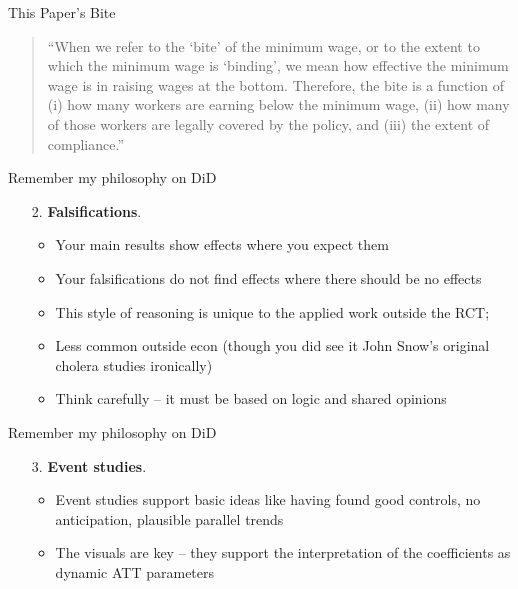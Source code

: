 \documentclass{beamer}
\begin{document}
\begin{frame}{This Paper's Bite}

\begin{quote}
``When we refer to the `bite' of the minimum wage, or to the extent to which the minimum wage is `binding', we mean how effective the minimum wage is in raising wages at the bottom.  Therefore, the bite is a function of (i) how many workers are earning below the minimum wage, (ii) how many of those workers are legally covered by the policy, and (iii) the extent of compliance.''
\end{quote}

\end{frame}



\begin{frame}{Remember my philosophy on DiD}

\begin{enumerate}
\item[2. ] \textbf{Falsifications}. 
	\begin{itemize}
	\item Your main results show effects where you expect them
	\item Your falsifications do not find effects where there should be no effects
	\item This style of reasoning is unique to the applied work outside the RCT;
	\item Less common outside econ (though you did see it John Snow's original cholera studies ironically)
	\item Think carefully -- it must be based on logic and shared opinions
	\end{itemize}
\end{enumerate}

\end{frame}


\begin{frame}{Remember my philosophy on DiD}

\begin{enumerate}
\item[3. ] \textbf{Event studies}. 
	\begin{itemize}
	\item Event studies support basic ideas like having found good controls, no anticipation, plausible parallel trends
	\item The visuals are key -- they support the interpretation of the coefficients as dynamic ATT parameters
	\end{itemize}
\end{enumerate}

\end{frame}
\end{document}
